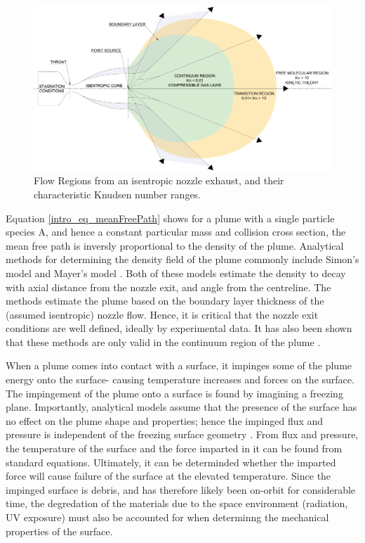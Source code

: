 \documentclass[journal]{new-aiaa}
\begin{document}
\begin{figure}[ht]
  \centering
  \includegraphics[width=\columnwidth]{Figures/FlowRegions.pdf}
  \caption{Flow Regions from an isentropic nozzle exhaust, and their characteristic Knudsen number ranges.}
  \label{intro_fig_FlowRegions}
\end{figure}

Equation \ref{intro_eq_meanFreePath} shows for a plume with a single particle species A, and hence a constant particular mass and collision cross section, the mean free path is inversly proportional to the density of the plume. Analytical methods for determining the density field of the plume commonly include Simon's model and Mayer's model \cite{simonsEffectNozzleBoundary1972} \cite{mayerThrustLossDue1986}. Both of these models estimate the density to decay with axial distance from the nozzle exit, and angle from the centreline. The methods estimate the plume based on the boundary layer thickness of the (assumed isentropic) nozzle flow. Hence, it is critical that the nozzle exit conditions are well defined, ideally by experimental data. It has also been shown that these methods are only valid in the continuum region of the plume \cite{boydModelingSmallHydrazine1990}.

When a plume comes into contact with a surface, it impinges some of the plume energy onto the surface- causing temperature increases and forces on the surface. The impingement of the plume onto a surface is found by imagining a freezing plane. Importantly, analytical models assume that the presence of the surface has no effect on the plume shape and properties; hence the impinged flux and pressure is independent of the freezing surface geometry \cite{herraiz2019development}. From flux and pressure, the temperature of the surface and the force imparted in it can be found from standard equations. Ultimately, it can be determinded whether the imparted force will cause failure of the surface at the elevated temperature. Since the impinged surface is debris, and has therefore likely been on-orbit for considerable time, the degredation of the materials due to the space environment (radiation, UV exposure) must also be accounted for when determinng the mechanical properties of the surface.
\end{document}
